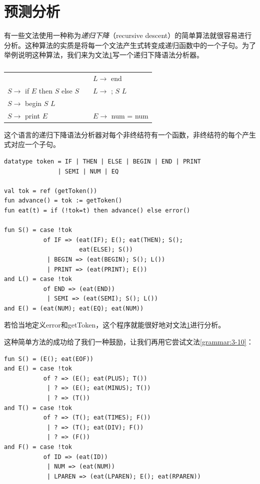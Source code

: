 \documentclass[cn,11pt,chinese]{elegantbook}
\begin{document}
\section{预测分析}

有一些文法使用一种称为\textit{递归下降}（recursive descent）的简单算法就很容易进行分析。这种算法的实质是将每一个文法产生式转变成递归函数中的一个子句。为了举例说明这种算法，我们来为文法\ref{grammar:3-11}写一个递归下降语法分析器。

\renewcommand\tablename{文法}
\begin{table}[htbp]
  \centering
  \begin{tabular}{lll}
    \toprule
    & & $L \rightarrow$ end \\
    $S \rightarrow$ if $E$ then $S$ else $S$ & & $L \rightarrow$ ; $S$ $L$ \\
    $S \rightarrow$ begin $S$ $L$ & & \\
    $S \rightarrow$ print $E$ & & $E \rightarrow$ num = num \\
    \bottomrule
  \end{tabular}
  \caption{}
  \label{grammar:3-11}
\end{table}
\renewcommand\tablename{表}

这个语言的递归下降语法分析器对每个非终结符有一个函数，非终结符的每个产生式对应一个子句。

\begin{verbatim}
datatype token = IF | THEN | ELSE | BEGIN | END | PRINT
               | SEMI | NUM | EQ
               
val tok = ref (getToken())
fun advance() = tok := getToken()
fun eat(t) = if (!tok=t) then advance() else error()

fun S() = case !tok
           of IF => (eat(IF); E(); eat(THEN); S();
                     eat(ELSE); S())
            | BEGIN => (eat(BEGIN); S(); L())
            | PRINT => (eat(PRINT); E())
and L() = case !tok
           of END => (eat(END))
            | SEMI => (eat(SEMI); S(); L())
and E() = (eat(NUM); eat(EQ); eat(NUM))
\end{verbatim}

若恰当地定义error和getToken，这个程序就能很好地对文法\ref{grammar:3-11}进行分析。

这种简单方法的成功给了我们一种鼓励，让我们再用它尝试文法\ref{grammar:3-10}：

\begin{verbatim}
fun S() = (E(); eat(EOF))
and E() = case !tok
           of ? => (E(); eat(PLUS); T())
            | ? => (E(); eat(MINUS); T())
            | ? => (T())
and T() = case !tok
           of ? => (T(); eat(TIMES); F())
            | ? => (T(); eat(DIV); F())
            | ? => (F())
and F() = case !tok
           of ID => (eat(ID))
            | NUM => (eat(NUM))
            | LPAREN => (eat(LPAREN); E(); eat(RPAREN))
\end{verbatim}
\end{document}
